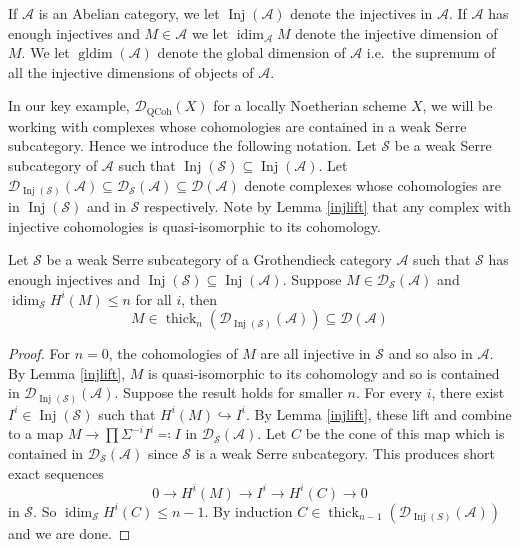 \documentclass[12pt,oneside]{amsart}
\DeclareMathOperator*{\Inj}{Inj}
\DeclareMathOperator{\thick}{thick}
\DeclareMathOperator{\QCoh}{QCoh}
\DeclareMathOperator{\idim}{idim}
\DeclareMathOperator{\gldim}{gldim}
\begin{document}
If $\mathcal{A}$ is an Abelian category, we let $\Inj(\mathcal{A})$ denote the injectives in $\mathcal{A}$. If $\mathcal{A}$ has enough injectives and $M \in \mathcal{A}$ we let $\idim_{\mathcal{A}} M$ denote the injective dimension of $M$. We let $\gldim(\mathcal{A})$ denote the global dimension of $\mathcal{A}$ i.e.\ the supremum of all the injective dimensions of objects of $\mathcal{A}$.

In our key example, $\mathcal{D}_{\QCoh}(X)$ for a locally Noetherian scheme $X$, we will be working with complexes whose cohomologies are contained in a weak Serre subcategory. Hence we introduce the following notation. Let $\mathcal{S}$ be a weak Serre subcategory of $\mathcal{A}$ such that $\Inj(\mathcal{S}) \subseteq \Inj(\mathcal{A})$. Let $\mathcal{D}_{\Inj(\mathcal{S})}(\mathcal{A}) \subseteq \mathcal{D}_{\mathcal{S}}(\mathcal{A}) \subseteq \mathcal{D}(\mathcal{A})$ denote complexes whose cohomologies are in $\Inj(\mathcal{S})$ and in $\mathcal{S}$ respectively. Note by Lemma \ref{injlift} that any complex with injective cohomologies is quasi-isomorphic to its cohomology. 




\begin{lemma} \label{injdimtogen}
Let $\mathcal{S}$ be a weak Serre subcategory of a Grothendieck category $\mathcal{A}$ such that $\mathcal{S}$ has enough injectives and $\Inj(\mathcal{S}) \subseteq \Inj(\mathcal{A})$. Suppose $M \in \mathcal{D}_{\mathcal{S}}(\mathcal{A})$ and $\idim_{\mathcal{S}} H^i(M) \leq n$ for all $i$, then 
\[
M \in \thick_n\left(\mathcal{D}_{\Inj(\mathcal{S})}(\mathcal{A})\right) \subseteq {\mathcal{D}(\mathcal{A})}
\]

\end{lemma}

\begin{proof}
For $n = 0$, the cohomologies of $M$ are all injective in $\mathcal{S}$ and so also in $\mathcal{A}$. By Lemma \ref{injlift}, $M$ is quasi-isomorphic to its cohomology and so is contained in $\mathcal{D}_{\Inj(\mathcal{S})}(\mathcal{A})$. Suppose the result holds for smaller $n$. For every $i$, there exist $I^i \in \Inj(\mathcal{S})$ such that $H^i(M) \hookrightarrow I^i$. By Lemma \ref{injlift}, these lift and combine to a map $M \to \prod \Sigma^{-i} I^i \eqcolon I$ in $\mathcal{D}_
{\mathcal{S}}(\mathcal{A})$. Let $C$ be the cone of this map which is contained in $\mathcal{D}_
{\mathcal{S}}(\mathcal{A})$ since $\mathcal{S}$ is a weak Serre subcategory. This produces short exact sequences
\[
0 \to H^i(M) \to I^i \to H^i(C) \to 0
\]
in $\mathcal{S}$. So $\idim_{\mathcal{S}} H^i(C) \leq n-1$. By induction $C \in \thick_{n-1}(\mathcal{D}_{\Inj(S)}(\mathcal{A}))$ and we are done.
\end{proof}
\end{document}
